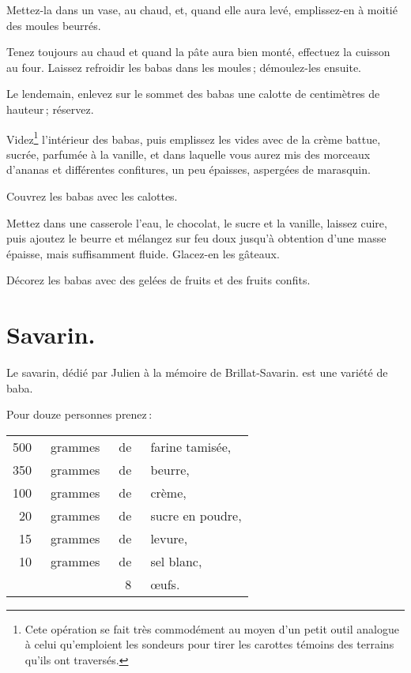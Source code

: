 Mettez-la dans un vase, au chaud, et, quand elle aura levé, emplissez-en
à moitié des moules beurrés.

Tenez toujours au chaud et quand la pâte aura bien monté, effectuez la cuisson
au four. Laissez refroidir les babas dans les moules ; démoulez-les ensuite.

Le lendemain, enlevez sur le sommet des babas une calotte de {\mmm}
centimètres de hauteur ; réservez.

Videz\footnote{Cete opération se fait très commodément au moyen d'un petit
outil analogue à celui qu'emploient les sondeurs pour tirer les carottes
témoins des terrains qu'ils ont traversés.} l'intérieur des babas, puis
emplissez les vides avec de la crème battue, sucrée, parfumée à la vanille, et
dans laquelle vous aurez mis des morceaux d'ananas et différentes confitures,
un peu épaisses, aspergées de marasquin.

Couvrez les babas avec les calottes.

Mettez dans une casserole l'eau, le chocolat, le sucre et la vanille, laissez
cuire, puis ajoutez le beurre et mélangez sur feu doux jusqu'à obtention d'une
masse épaisse, mais suffisamment fluide. Glacez-en les gâteaux.

Décorez les babas avec des gelées de fruits et des fruits confits.

\section*{\centering Savarin.}
{}

Le savarin, dédié par Julien à la mémoire de Brillat-Savarin. est une variété de
baba.

\medskip

Pour douze personnes prenez :

\footnotesize
\begin{longtable}{rrrp{16em}}
    500 & grammes & de & farine tamisée,                                                                  \\
    350 & grammes & de & beurre,                                                                          \\
    100 & grammes & de & crème,                                                                           \\
     20 & grammes & de & sucre en poudre,                                                                 \\
     15 & grammes & de & levure,                                                                          \\
     10 & grammes & de & sel blanc,                                                                       \\
        &         &  8 & œufs.                                                                            \\
\end{longtable}
\normalsize

